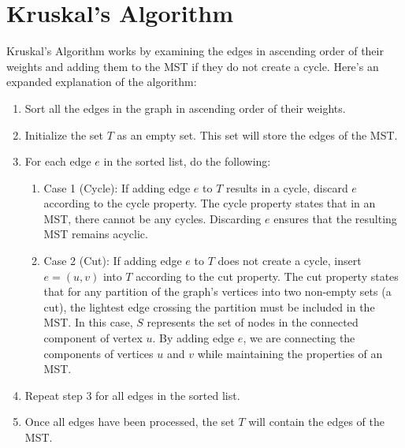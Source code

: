 \documentclass[12pt]{article}
\newcommand{\1}{\space \quad}
\newcommand{\2}{\quad \quad \quad}
\newcommand{\3}{\quad \quad \quad \quad \space}
\newcommand{\4}{\quad \quad \quad \quad \quad \quad}
\newcommand{\5}{\quad \quad \quad \quad \quad \quad \quad \space}
\begin{document}
\section{Kruskal's Algorithm}
Kruskal's Algorithm works by examining the edges in ascending order of their weights and adding 
them to the MST if they do not create a cycle. Here's an expanded explanation of the algorithm:

\begin{enumerate}
  \item Sort all the edges in the graph in ascending order of their weights.
  \item Initialize the set $T$ as an empty set. This set will store the edges of the MST.
  \item For each edge $e$ in the sorted list, do the following:
  \begin{enumerate}
    \item Case 1 (Cycle): If adding edge $e$ to $T$ results in a cycle, discard $e$ according to the 
    cycle property. The cycle property states that in an MST, there cannot be any cycles. Discarding 
    $e$ ensures that the resulting MST remains acyclic.
    \item Case 2 (Cut): If adding edge $e$ to $T$ does not create a cycle, insert $e = (u, v)$ into 
    $T$ according to the cut property. The cut property states that for any partition of the graph's 
    vertices into two non-empty sets (a cut), the lightest edge crossing the partition must be included 
    in the MST. In this case, $S$ represents the set of nodes in the connected component of vertex $u$. 
    By adding edge $e$, we are connecting the components of vertices $u$ and $v$ while maintaining the 
    properties of an MST.
  \end{enumerate}
  \item Repeat step 3 for all edges in the sorted list.
  \item Once all edges have been processed, the set $T$ will contain the edges of the MST.
\end{enumerate}
\end{document}
